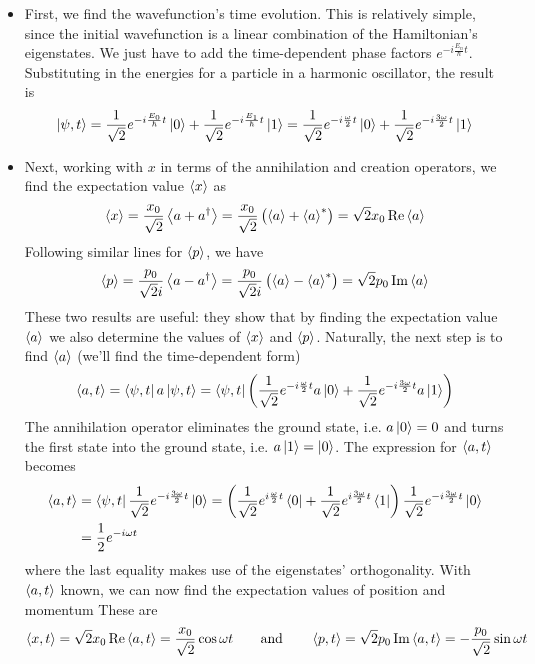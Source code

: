 \documentclass[11pt, a4paper]{article}
\newcommand{\eqtext}[1]{\qquad \text{#1} \qquad}
\begin{document}
\begin{itemize}
	\item First, we find the wavefunction's time evolution. This is relatively simple, since the initial wavefunction is a linear combination of the Hamiltonian's eigenstates. We just have to add the time-dependent phase factors $ e^{-i\frac{E_{n}}{\hbar}t} $. Substituting in the energies for a particle in a harmonic oscillator, the result is
	\begin{equation*}
		\ket{\psi, t} = \frac{1}{\sqrt{2}} e^{-i\frac{E_{0}}{\hbar}t}\ket{0} + \frac{1}{\sqrt{2}} e^{-i\frac{E_{1}}{\hbar}t}\ket{1}  =  \frac{1}{\sqrt{2}} e^{-i\frac{\omega}{2}t}\ket{0} + \frac{1}{\sqrt{2}} e^{-i\frac{3\omega}{2}t}\ket{1}
	\end{equation*}
	
	\item Next, working with $ x $ in terms of the annihilation and creation operators, we find the expectation value $ \ev{x} $ as
	\begin{equation*}
		\ev{x} = \frac{x_{0}}{\sqrt{2}}\ev{a + a^{\dagger}} = \frac{x_{0}}{\sqrt{2}}\left(\ev{a} + \ev{a}^{*}\right) =  \sqrt{2}x_{0} \Re \ev{a}
	\end{equation*}
	Following similar lines for $ \ev{p} $, we have
	\begin{equation*}
		\ev{p} = \frac{p_{0}}{\sqrt{2}i}\ev{a - a^{\dagger}} = \frac{p_{0}}{\sqrt{2}i}\left(\ev{a} - \ev{a}^{*}\right) = \sqrt{2}p_{0}\Im \ev{a}
	\end{equation*}
	These two results are useful: they show that by finding the expectation value $ \ev{a} $ we also determine the values of $ \ev{x} $ and $ \ev{p} $. Naturally, the next step is to find $ \ev{a} $ (we'll find the time-dependent form)
	\begin{equation*}
		\ev{a, t} = \bra{\psi, t}a\ket{\psi, t} = \bra{\psi, t}\left(\frac{1}{\sqrt{2}}e^{-i\frac{\omega}{2}t}a \ket{0} + \frac{1}{\sqrt{2}}e^{-i\frac{3\omega}{2}t}a \ket{1}\right)
	\end{equation*}
	The annihilation operator eliminates the ground state, i.e. $ a \ket{0} = 0 $ and turns the first state into the ground state, i.e. $ a \ket{1} = \ket{0} $. The expression for $ \ev{a, t} $ becomes
	\begin{align*}
		\ev{a, t} &= \bra{\psi, t}\frac{1}{\sqrt{2}}e^{-i\frac{3\omega}{2}t}\ket{0} = \left(\frac{1}{\sqrt{2}}e^{i\frac{\omega}{2}t}\bra{0} + \frac{1}{\sqrt{2}}e^{i\frac{3\omega}{2}t}\bra{1}\right) \frac{1}{\sqrt{2}}e^{-i\frac{3\omega}{2}t}\ket{0}\\
		&=\frac{1}{2}e^{-i\omega t} 
	\end{align*}
	where the last equality makes use of the eigenstates' orthogonality. With $ \ev{a, t} $ known, we can now find the expectation values of position and momentum These are
	\begin{equation*}
		\ev{x, t} = \sqrt{2}x_{0}\Re\ev{a, t} = \frac{x_{0}}{\sqrt{2}}\cos \omega t \eqtext{and} \ev{p, t} = \sqrt{2}p_{0}\Im\ev{a, t} = - \frac{p_{0}}{\sqrt{2}}\sin \omega t
	\end{equation*}
	

\end{itemize}
\end{document}
